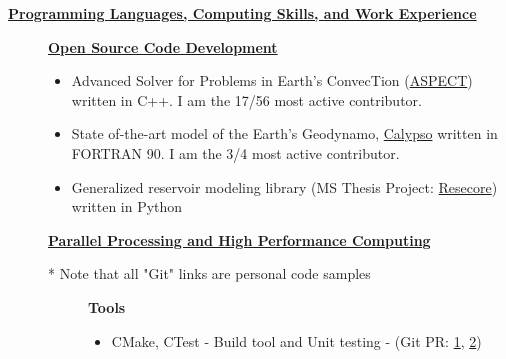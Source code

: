 \documentclass[11pt]{ltxdoc}
\begin{document}
\vskip 18pt

\begin{center}
	\textbf{\underline{Programming Languages, Computing Skills, and Work Experience}}
\end{center}

  \begin{description}
  	
    \item[] \textbf{\underline{Open Source Code Development}}
    
      \begin{itemize}
      	
        \item Advanced Solver for Problems in Earth's ConvecTion (\href{https://github.com/geodynamics/aspect}{ASPECT}) written in C++. I am the 17/56 most active contributor.
      
      \item State of-the-art model of the Earth's Geodynamo,
      \href{https://geodynamics.org/cig/software/calypso/}{Calypso} written in FORTRAN 90. I am the 3/4 most active contributor.
      
      \item Generalized reservoir modeling library (MS Thesis Project: \href{https://github.com/hlokavarapu/resecore.git}{Resecore}) written in Python
            
    \end{itemize}
                                            
    \item[] \textbf{\underline{Parallel Processing and High Performance Computing}}
          
      \vskip 06pt
      
      * Note that all "Git" links are personal code samples 
      
      \begin{description}
    
    	\item[] \textbf{Tools}
     
        \vskip 06pt   
        
        \begin{itemize} 
        
          \item CMake, CTest - Build tool and Unit testing - (Git PR: \href{https://github.com/hlokavarapu/computational_tools/tree/master/ASPECT_build_scripts}{1}, \href{https://github.com/geodynamics/calypso/pull/4}{2})
      

\end{itemize}
\end{description}
\end{description}
\end{document}
